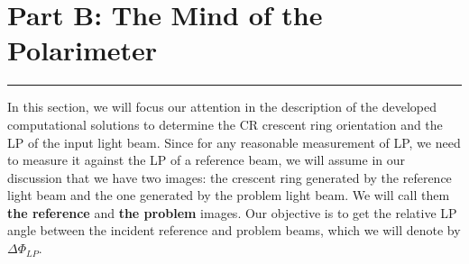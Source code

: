 \documentclass[11pt, a4paper, twoside]{article} %
\begin{document}
\section*{\centering \huge{Part B: The Mind of the Polarimeter}\vspace{-0.3cm}}
\noindent\rule{\textwidth}{0.4pt}

In this section, we will focus our attention in the description of the developed computational solutions to determine the CR crescent ring orientation and the LP of the input light beam. Since for any reasonable measurement of LP, we need to measure it against the LP of a reference beam, we will assume in our discussion that we have two images: the crescent ring generated by the reference light beam and the one generated by the problem light beam. We will call them {\bf the reference} and {\bf the problem} images. Our objective is to get the relative LP angle between the incident reference and problem beams, which we will denote by $\Delta \Phi_{LP}$.
\end{document}
